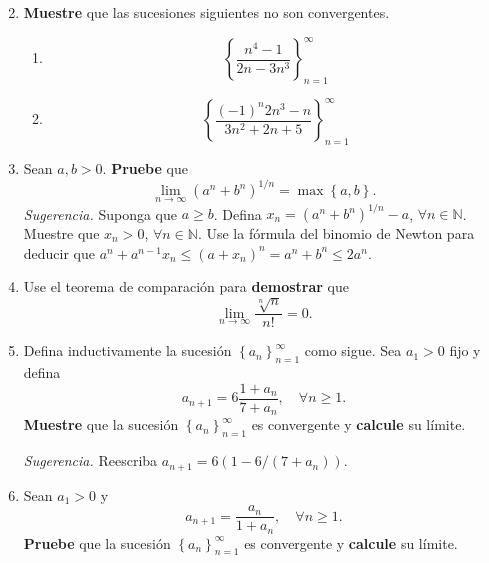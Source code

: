 \documentclass[12pt]{article}
\begin{document}
\begin{enumerate}
\begin{equation*}
    \end{equation*}
    \item \textbf{Muestre} que las sucesiones siguientes no son convergentes.
        \begin{multicols}{2}
            \begin{enumerate}
                \item \begin{equation*}
                        \left\{\frac{n^4-1}{2n-3n^3}\right\}_{n=1}^{\infty}
                    \end{equation*}
                \item \begin{equation*}
                        \left\{\frac{(-1)^n2n^3-n}{3n^2+2n+5}\right\}_{n=1}^{\infty}
                    \end{equation*}
            \end{enumerate}
        \end{multicols}
    \item Sean $a,b>0$. \textbf{Pruebe} que
    \begin{equation*}
        \lim_{n\rightarrow\infty}\left(a^n+b^n\right)^{1/n}=\max\left\{a,b\right\}.
    \end{equation*}
        \textit{Sugerencia.} Suponga que $a\geq b$. Defina $x_n=(a^n+b^n)^{1/n}-a$, $\forall n\in\mathbb{N}$. Muestre que $x_n>0$, $\forall n\in\mathbb{N}$. Use la fórmula del binomio de Newton para deducir que $a^n+a^{n-1}x_n\leq \left(a+x_n\right)^n=a^n+b^n\leq 2a^n$.
    \item Use el teorema de comparación para \textbf{demostrar} que
    \begin{equation*}
        \lim_{n\rightarrow\infty}\frac{\sqrt[n]{n}}{n!}=0.
    \end{equation*}
    \item Defina inductivamente la sucesión $\left\{a_n\right\}_{n=1}^{\infty}$ como sigue. Sea $a_1>0$ fijo y defina
    \begin{equation*}
        a_{n+1}=6\frac{1+a_n}{7+a_n},\quad \forall n\geq 1.
    \end{equation*}
    \textbf{Muestre} que la sucesión $\left\{a_n\right\}_{n=1}^{\infty}$ es convergente y \textbf{calcule} su límite.
    
    \textit{Sugerencia.} Reescriba $a_{n+1}=6(1-6/(7+a_n))$.
    \item Sean $a_1>0$ y
    \begin{equation*}
        a_{n+1}=\frac{a_n}{1+a_n},\quad\forall n\geq 1.
    \end{equation*}
    \textbf{Pruebe} que la sucesión $\left\{a_n\right\}_{n=1}^{\infty}$ es convergente y \textbf{calcule} su límite.
    

\end{enumerate}
\end{document}
